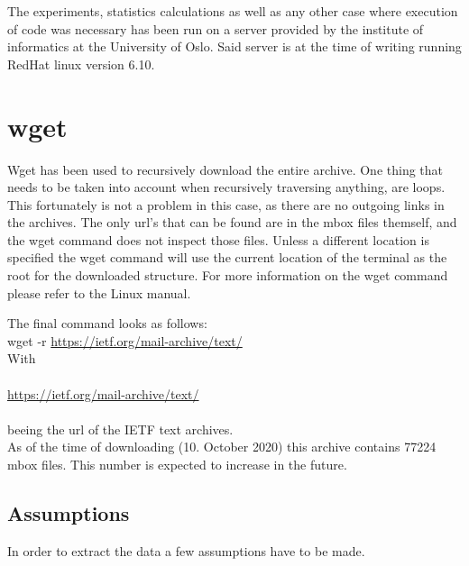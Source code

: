 \documentclass[a4paper,english]{report}
\begin{document}
The experiments, statistics calculations as well as any other case where execution of code was necessary has been run on a server provided by the institute of informatics at the University of Oslo.
Said server is at the time of writing  running RedHat linux version 6.10.


\section{wget}

Wget has been used to recursively download the entire archive.
One thing that needs to be taken into account when recursively traversing anything, are loops.
This fortunately is not a  problem in this case, as there are no outgoing links in the archives. The only url's that can be found are in the mbox files themself, and the wget command does not inspect those files.
Unless a different location is specified the wget command will use the current location of the terminal as the root for the downloaded structure.
For more information on the wget command please refer to the Linux manual.


\noindent
The final command looks as follows: \\

wget -r \url{ https://ietf.org/mail-archive/text/}\\

\noindent
With\\\\
  \url{ https://ietf.org/mail-archive/text/}\\\\
 beeing the url of the IETF text archives.\\

As of the time of downloading (10. October 2020) this archive contains 77224 mbox files. This number is expected to increase in the future.




\subsection{Assumptions}

In order to extract the data a few assumptions have to be made.
\end{document}
